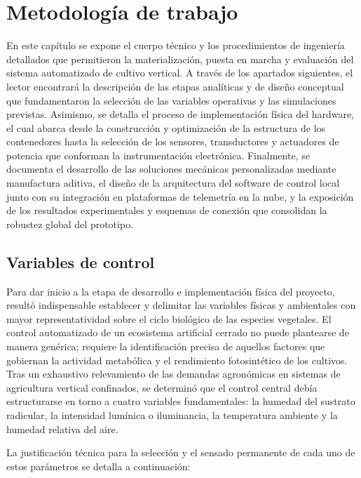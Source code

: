 \chapter{Metodología de trabajo}
En este capítulo se expone el cuerpo técnico y los procedimientos de ingeniería detallados que permitieron la materialización, puesta en marcha y evaluación del sistema automatizado de cultivo vertical. A través de los apartados siguientes, el lector encontrará la descripción de las etapas analíticas y de diseño conceptual que fundamentaron la selección de las variables operativas y las simulaciones previstas. Asimismo, se detalla el proceso de implementación física del hardware, el cual abarca desde la construcción y optimización de la estructura de los contenedores hasta la selección de los sensores, transductores y actuadores de potencia que conforman la instrumentación electrónica. Finalmente, se documenta el desarrollo de las soluciones mecánicas personalizadas mediante manufactura aditiva, el diseño de la arquitectura del software de control local junto con su integración en plataformas de telemetría en la nube, y la exposición de los resultados experimentales y esquemas de conexión que consolidan la robustez global del prototipo.

\section{Variables de control}
Para dar inicio a la etapa de desarrollo e implementación física del proyecto, resultó indispensable establecer y delimitar las variables físicas y ambientales con mayor representatividad sobre el ciclo biológico de las especies vegetales. El control automatizado de un ecosistema artificial cerrado no puede plantearse de manera genérica; requiere la identificación precisa de aquellos factores que gobiernan la actividad metabólica y el rendimiento fotosintético de los cultivos. Tras un exhaustivo relevamiento de las demandas agronómicas en sistemas de agricultura vertical confinados, se determinó que el control central debía estructurarse en torno a cuatro variables fundamentales: la humedad del sustrato radicular, la intensidad lumínica o iluminancia, la temperatura ambiente y la humedad relativa del aire.

La justificación técnica para la selección y el sensado permanente de cada uno de estos parámetros se detalla a continuación:

